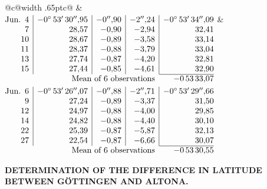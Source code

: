 \noindent\begin{tabular}{@{}c@{\hspace{.4em}\vrule width .65pt\hspace{.4em}}c@{}}
 &
 \\[.18ex]
\(\begin{array}[t]{@{}r|r|r|r|r@{}}
\text{Jun.}\enspace 4 & -0^\circ\,53'\,30''{,}95 & -0''{,}90 & -2''{,}24 & -0^\circ\,53'\,34''{,}09\\
7 & 28{,}57 & -0{,}90 & -2{,}94 & 32{,}41\\
10 & 28{,}67 & -0{,}89 & -3{,}58 & 33{,}14\\
11 & 28{,}37 & -0{,}88 & -3{,}79 & 33{,}04\\
13 & 27{,}74 & -0{,}87 & -4{,}20 & 32{,}81\\
15 & 27{,}44 & -0{,}85 & -4{,}61 & 32{,}90\\
\cline{5-5}
\multicolumn{4}{r}{\text{Mean of 6 observations}} & -0\,53\,33{,}07
\end{array}\)
&
\(\begin{array}[t]{@{}r|r|r|r|r@{}}
\text{Jun.}\enspace 6 & -0^\circ\,53'\,26''{,}07 & -0''{,}88 & -2''{,}71 & -0^\circ\,53'\,29''{,}66\\
9 & 27{,}24 & -0{,}89 & -3{,}37 & 31{,}50\\
12 & 24{,}97 & -0{,}88 & -4{,}00 & 29{,}85\\
14 & 24{,}82 & -0{,}88 & -4{,}40 & 30{,}10\\
22 & 25{,}39 & -0{,}87 & -5{,}87 & 32{,}13\\
27 & 22{,}54 & -0{,}87 & -6{,}66 & 30{,}07\\
\cline{5-5}
\multicolumn{4}{r}{\text{Mean of 6 observations}} & -0\,53\,30{,}55
\end{array}\)
\end{tabular}\par\medskip

\par\clearpage
\noindent{}\parbox[t]{\dimexpr\linewidth-24mm\relax}{\centering\scriptsize\bfseries DETERMINATION OF THE DIFFERENCE IN LATITUDE BETWEEN GÖTTINGEN AND ALTONA.}\makebox[12mm][r]{}\par\medskip

